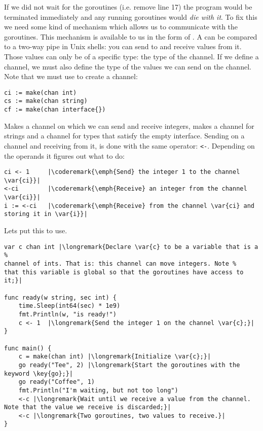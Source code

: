 If we did not wait for the goroutines (i.e. remove line 17) the program
would be terminated immediately and any running goroutines would
\emph{die with it}. 
To fix this we need some kind of mechanism which allows us to
communicate with the goroutines. This mechanism is available
to us in the form of . A
 can be
compared to a two-way pipe in Unix shells: you can send to and receive
values from it. Those values can only be of a specific type: the
type of the channel. If we define a channel, we must also define the
type of the values we can send on the channel. Note that we must use
 to create a channel:
\begin{lstlisting}
ci := make(chan int)
cs := make(chan string)
cf := make(chan interface{})
\end{lstlisting}
Makes  a channel on which we can send and receive integers,
makes  a channel for strings and  a channel for types
that satisfy the empty interface. 
Sending on a channel and receiving from it, is done with the same operator:
\lstinline{<-}. 
Depending on the operands it figures out what to do:
\begin{lstlisting}
ci <- 1	    |\coderemark{\emph{Send} the integer 1 to the channel \var{ci}}|
<-ci	    |\coderemark{\emph{Receive} an integer from the channel \var{ci}}|
i := <-ci   |\coderemark{\emph{Receive} from the channel \var{ci} and storing it in \var{i}}|
\end{lstlisting}
Lets put this to use.
\begin{lstlisting}[numbers=none,caption=Go routines and a channel,label=src:sleeping with channels]
var c chan int |\longremark{Declare \var{c} to be a variable that is a %
channel of ints. That is: this channel can move integers. Note %
that this variable is global so that the goroutines have access to it;}|

func ready(w string, sec int) {
	time.Sleep(int64(sec) * 1e9)
	fmt.Println(w, "is ready!")
	c <- 1	|\longremark{Send the integer 1 on the channel \var{c};}|
}

func main() {
	c = make(chan int) |\longremark{Initialize \var{c};}|
	go ready("Tee", 2) |\longremark{Start the goroutines with the keyword \key{go};}|
	go ready("Coffee", 1)
	fmt.Println("I'm waiting, but not too long")
	<-c |\longremark{Wait until we receive a value from the channel. Note that the value we receive is discarded;}|
	<-c |\longremark{Two goroutines, two values to receive.}|
}
\end{lstlisting}

